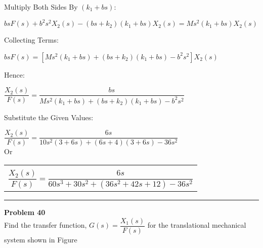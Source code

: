 \documentclass[11pt,letterpaper]{article}
\begin{document}
Multiply Both Sides By $(k_1+bs)$:\\
\begin{center}
	$bsF(s)+b^2s^2X_2(s)-(bs+k_2)(k_1+bs)X_2(s)=Ms^2(k_1+bs)X_2(s)$\\
\end{center}
Collecting Terms:\\
\begin{center}
	$bsF(s)=[Ms^2(k_1+bs)+(bs+k_2)(k_1+bs)-b^2s^2]X_2(s)$\\
\end{center}
Hence:\\
\begin{center}
	$\dfrac{X_2(s)}{F(s)}=\dfrac{bs}{Ms^2(k_1+bs)+(bs+k_2)(k_1+bs)-b^2s^2}$\\
\end{center}

Substitute the Given Values:\\
\begin{center}
	$\dfrac{X_2(s)}{F(s)}=\dfrac{6s}{10s^2(3+6s)+(6s+4)(3+6s)-36s^2}$\\[12pt]
	Or\\[12pt]
	\begin{tabular}{|c|}
		\hline \\
		$\dfrac{X_2(s)}{F(s)}=\dfrac{6s}{60s^3+30s^2+(36s^2+42s+12)-36s^2}$\\[12pt]
		\hline
	\end{tabular}	
\end{center}

\clearpage

\rule{\textwidth}{1pt}
\textbf{Problem 40}\\
Find the transfer function, $G(s)=\dfrac{X_1(s)}{F(s)}$ for the translational mechanical system shown in Figure\\
\end{document}
